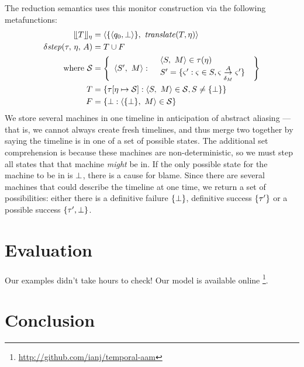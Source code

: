 \documentclass[preprint,onecolumn,9pt]{sigplanconf} %
\begin{document}
The reduction semantics uses this monitor construction via the following metafunctions:
\begin{align*}
  \compile{\mtcon}{\mtimeline} &= \npmsm{\setof{\pmsmstate{\pmsmq_0, \bot}}}{\translateeps(\mtcon, \mtimeline)} \\
  \sstep{\mTMons}{\mtimeline}{\mevent} &= T \cup F \\
    \text{where } {\mathcal S} &= \left\{
\ensuremath{
      \begin{array}{ll}
        \npmsm{S'}{\pmsmMachine} : &
        \begin{array}{l}
\npmsm{S}{\pmsmMachine} \in     \mTMons(\mtimeline) \\
 S' = \setbuild{\mstate'}{\mstate \in S, \mstate \pmsmstepd{\mevent}{\delta_\pmsmMachine} \mstate'}
\end{array}
      \end{array}
}\right\}
\\\phantom{\text{where }} T &= \setbuild{\mTMons[\mtimeline \mapsto {\mathcal S}]}{\npmsm{S}{\pmsmMachine} \in {\mathcal S}, S \neq \setof{\stfail}}
\\\phantom{\text{where }} F &= \setbuild{\stfail}{\npmsm{\setof{\stfail}}{\pmsmMachine} \in {\mathcal S}}
\end{align*}
We store several machines in one timeline in anticipation of abstract aliasing --- that is, we cannot always create fresh timelines, and thus merge two together by saying the timeline is in one of a set of possible states.
%
The additional set comprehension is because these machines are non-deterministic, so we must step all states that that machine \emph{might} be in.
%
If the only possible state for the machine to be in is $\bot$, there is a cause for blame.
%
Since there are several machines that could describe the timeline at one time, we return a set of possibilities: either there is a definitive failure $\{\bot\}$, definitive success $\{\tau'\}$ or a possible success $\{\tau', \bot\}$.

\section{Evaluation}

Our examples didn't take hours to check!
%
Our model is available online \footnote{\url{http://github.com/ianj/temporal-aam}}.

\section{Conclusion}
\end{document}
